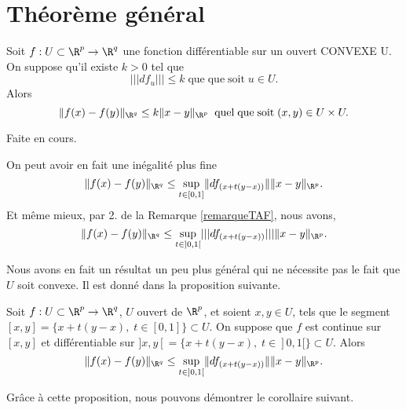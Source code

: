 \documentclass[class=report,crop=false]{standalone}
\begin{document}
 \section{Th\'eor\`eme g\'en\'eral}
 
  \begin{theoreme}
\textcolor[rgb]{0.44,0.00,0.87}{
  Soit $f:U \subset \R^p \rightarrow \R^q$ une fonction diff\'erentiable sur un ouvert CONVEXE U. On suppose qu'il existe
$k>0$ tel que
\begin{equation*}
  |||df_u|||\leq k \mathrm{\;que \; que\; soit\;} u \in U.
\end{equation*}
Alors
\begin{equation*}
   \|f(x)-f(y)\|_{\R^q} \leq k \|x-y\|_{\R^p} \;\mathrm{\;quel \; que \; soit\;}(x,y)\in U\times U.
\end{equation*}}
\end{theoreme}
   Faite en cours.
  
  
  \begin{remarque*}
\textcolor[rgb]{0.00,0.00,1.00}{
  On peut avoir en fait une in\'egalit\'e plus fine
\begin{equation*}
   \|f(x)-f(y)\|_{\R^q} \leq \underset{t\in [0,1]}{\sup}\|df_{(x+t(y-x))}\|  \|x-y\|_{\R^p}.
\end{equation*}
Et m\^eme mieux, par  2. de la Remarque \ref{remarqueTAF}, nous avons,
\begin{equation*}
   \|f(x)-f(y)\|_{\R^q} \leq \underset{t\in ]0,1[}{\sup}|||df_{(x+t(y-x))}|||  \|x-y\|_{\R^p}.
\end{equation*}}
\end{remarque*}

\noindent Nous avons en fait un r\'esultat un peu plus g\'en\'eral qui ne n\'ecessite pas le fait que $U$ soit convexe. Il est donn\'e dans la proposition suivante.

\begin{proposition}
\textcolor[rgb]{0.44,0.00,0.87}{
  Soit $f:U \subset \R^p \rightarrow \R^q$, $U$ ouvert de $\R^p$, et soient $x,y \in U$, tels que le segment $[x,y]=\{x+t(y-x),\; t\in [0,1]\} \subset U$.
  On suppose que $f$ est continue sur $[x,y]$ et diff\'erentiable sur $]x,y[=\{x+t(y-x),\; t\in ]0,1[\} \subset U$. Alors
 \begin{equation*}
   \|f(x)-f(y)\|_{\R^q} \leq \underset{t\in ]0,1[}{\sup} \| df_{(x+t(y-x))}\|  \|x-y\|_{\R^p}.
\end{equation*}}
\end{proposition}
\noindent Gr\^ace \`a cette proposition, nous pouvons d\'emontrer le corollaire suivant.
\end{document}

